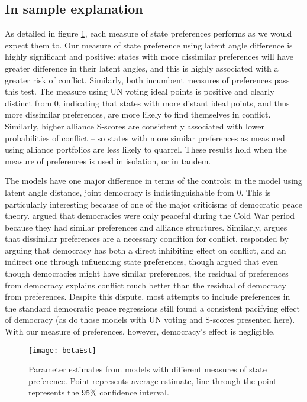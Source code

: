 \subsection{In sample explanation}
As detailed in figure \ref{fig:coefP}, each measure of state preferences performs as we would expect them to. Our measure of state preference using latent angle difference is highly significant and positive: states with more dissimilar preferences will have greater difference in their latent angles, and this is highly associated with a greater risk of conflict. Similarly, both incumbent measures of preferences pass this test. The measure using UN voting ideal points is positive and clearly distinct from $0$, indicating that states with more distant ideal points, and thus more dissimilar preferences, are more likely to find themselves in conflict. Similarly, higher alliance S-scores are consistently associated with lower probabilities of conflict -- so states with more similar preferences as measured using alliance portfolios are less likely to quarrel. These results hold when the measure of preferences is used in isolation, or in tandem.

The models have one major difference in terms of the controls: in the model using latent angle distance, joint democracy is indistinguishable from $0$. This is particularly interesting because of one of the major criticisms of democratic peace theory. \citet{gowa:farber:year} argued that democracies were only peaceful during the Cold War period because they had similar preferences and alliance structures. Similarly, \citet{gartzke:year} argues that dissimilar preferences are a necessary condition for conflict. \citet{oneal:russett:1998} responded by arguing that democracy has both a direct inhibiting effect on conflict, and an indirect one through influencing state preferences, though \citet{gartzke:year} argued that even though democracies might have similar preferences, the residual of preferences from democracy explains conflict much better than the residual of democracy from preferences. Despite this dispute, most attempts to include preferences in the standard democratic peace regressions still found a consistent pacifying effect of democracy (as do those models with UN voting and S-scores presented here). With our measure of preferences, however, democracy's effect is negligible.


\begin{figure}[ht]
	\centering
	\texttt{[image: betaEst]}
	\caption{Parameter estimates from models with different measures of state preference. Point represents average estimate, line through the point represents the 95\% confidence interval.}
	\label{fig:coefP}
\end{figure}
\FloatBarrier

